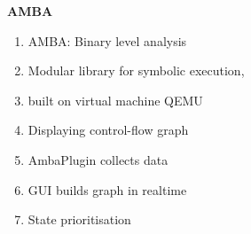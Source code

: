 \begin{frame}

	\begin{columns}[t]
		\begin{column}{0.4\textwidth}
			\textbf{AMBA}
			\small
			\begin{enumerate}
                \item AMBA: Binary level analysis
				\item Modular library for symbolic execution, \stoe{}
				\item \stoe{} built on virtual machine QEMU
                \item Displaying control-flow graph
                \item AmbaPlugin collects data
                \item GUI builds graph in realtime
                \item State prioritisation
			\end{enumerate}
		\end{column}
	\end{columns}
\end{frame}
